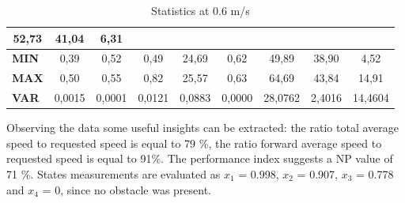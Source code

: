 \begin{table}[H]
{\begin{tabular}{lcccccccc}
  \multicolumn{1}{c|}{{\color[HTML]{595959} 52,73}} &
  \multicolumn{1}{c|}{{\color[HTML]{595959} 41,04}} &
  \multicolumn{1}{c|}{{\color[HTML]{595959} 6,31}} \\ \hline
\multicolumn{1}{|l|}{\textbf{MIN}} &
  \multicolumn{1}{c|}{{\color[HTML]{595959} 0,39}} &
  \multicolumn{1}{c|}{{\color[HTML]{595959} 0,52}} &
  \multicolumn{1}{c|}{{\color[HTML]{595959} 0,49}} &
  \multicolumn{1}{c|}{{\color[HTML]{595959} 24,69}} &
  \multicolumn{1}{c|}{{\color[HTML]{595959} 0,62}} &
  \multicolumn{1}{c|}{{\color[HTML]{595959} 49,89}} &
  \multicolumn{1}{c|}{{\color[HTML]{595959} 38,90}} &
  \multicolumn{1}{c|}{{\color[HTML]{595959} 4,52}} \\ \hline
\multicolumn{1}{|l|}{\textbf{MAX}} &
  \multicolumn{1}{c|}{{\color[HTML]{595959} 0,50}} &
  \multicolumn{1}{c|}{{\color[HTML]{595959} 0,55}} &
  \multicolumn{1}{c|}{{\color[HTML]{595959} 0,82}} &
  \multicolumn{1}{c|}{{\color[HTML]{595959} 25,57}} &
  \multicolumn{1}{c|}{{\color[HTML]{595959} 0,63}} &
  \multicolumn{1}{c|}{{\color[HTML]{595959} 64,69}} &
  \multicolumn{1}{c|}{{\color[HTML]{595959} 43,84}} &
  \multicolumn{1}{c|}{{\color[HTML]{595959} 14,91}} \\ \hline
\multicolumn{1}{|l|}{\textbf{VAR}} &
  \multicolumn{1}{c|}{{\color[HTML]{595959} 0,0015}} &
  \multicolumn{1}{c|}{{\color[HTML]{595959} 0,0001}} &
  \multicolumn{1}{c|}{{\color[HTML]{595959} 0,0121}} &
  \multicolumn{1}{c|}{{\color[HTML]{595959} 0,0883}} &
  \multicolumn{1}{c|}{{\color[HTML]{595959} 0,0000}} &
  \multicolumn{1}{c|}{{\color[HTML]{595959} 28,0762}} &
  \multicolumn{1}{c|}{{\color[HTML]{595959} 2,4016}} &
  \multicolumn{1}{c|}{{\color[HTML]{595959} 14,4604}} \\ \hline
\end{tabular}%
}
\caption{Statistics at 0.6 m/s}
\label{tab:speed06test}
\end{table}
Observing the data some useful insights can be extracted: the ratio total average speed to requested speed is equal to 79 \%, the ratio forward average speed to requested speed is equal to 91\%. The performance index suggests a NP value of 71 \%.
States measurements are evaluated as $x_1$ = 0.998, $x_2$ = 0.907, $x_3$ = 0.778 and $x_4$ = 0, since no obstacle was present.

